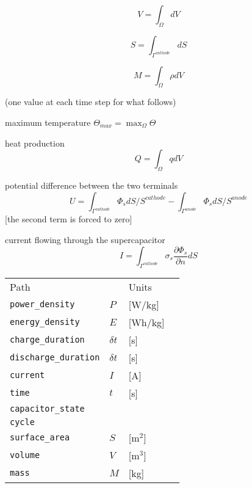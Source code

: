 \documentclass[10pt, oneside]{article}   	%
\begin{document}
\begin{equation}
V = \int_\Omega dV
\end{equation}

\begin{equation}
S = \int_{\Gamma^{cathode}} dS
\end{equation}

\begin{equation}
M = \int_{\Omega} \rho dV
\end{equation}

(one value at each time step for what follows)

maximum temperature $\Theta_{max} = \max_{\Omega} \Theta$

heat production
\begin{equation}
Q = \int_\Omega q dV
\end{equation}


potential difference between the two terminals
\begin{equation}
U = \int_{\Gamma^{cathode}} \Phi_s dS / S^{cathode} 
- \int_{\Gamma^{anode}} \Phi_s dS / S^{anode}
\end{equation}
[the second term is forced to zero]

current flowing through the supercapacitor
\begin{equation}
I = \int_{\Gamma^{cathode}} \sigma_s \frac{\partial \Phi_s}{\partial n} dS
\end{equation}


{\footnotesize
\begin{tabular}{llll}
Path                         &                & Units   \\
\texttt{power\_density}      & $P$            & [W/kg]  \\
\texttt{energy\_density}     & $E$            & [Wh/kg] \\
\texttt{charge\_duration}    & $\delta t$     & [s] \\
\texttt{discharge\_duration} & $\delta t$     & [s] \\
\texttt{current}          & $I$            & [A] \\
\texttt{time}             & $t$            & [s] \\
\texttt{capacitor\_state} \\
\texttt{cycle}            \\
\texttt{surface\_area}    & $S$           & [m$^2$] \\
\texttt{volume}           & $V$           & [m$^3$] \\
\texttt{mass}             & $M$           & [kg]    \\
\end{tabular}
}
\end{document}
